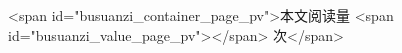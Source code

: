\begin{html}
<span id="busuanzi_container_page_pv">本文阅读量 <span id="busuanzi_value_page_pv"></span> 次</span>
\end{html}
